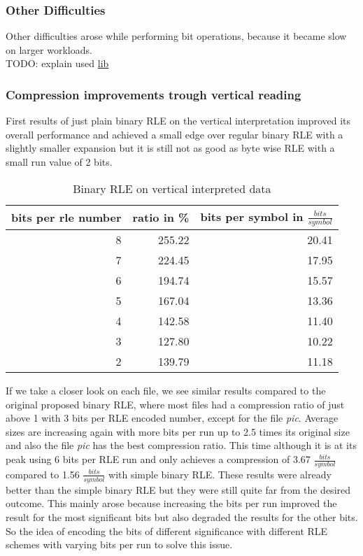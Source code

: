 \subsubsection{Other Difficulties}
\par{
Other difficulties arose while performing bit operations, because it became slow on larger workloads. \\

TODO: explain used \href{https://discuss.kotlinlang.org/t/i-o-streams-for-kotlin/9802}{lib}}

\subsubsection{Compression improvements trough vertical reading}
\par{
First results of just plain binary RLE on the vertical interpretation improved its overall performance and achieved a small edge over regular binary RLE with a slightly smaller expansion but it is still not as good as byte wise RLE with a small run value of 2 bits.
\begin{table}[H]
	\centering
	\begin{tabular}{r|r|r}	
		bits per rle number & ratio in \% & bits per symbol in $\frac{bits}{symbol}$\\
		\hline
		8 & 255.22 & 20.41\\
		7 & 224.45 & 17.95\\
		6 & 194.74 & 15.57\\
		5 & 167.04 & 13.36\\
		4 & 142.58 & 11.40\\
		3 & 127.80 & 10.22\\
		2 & 139.79 & 11.18 \\
	\end{tabular}
	\caption{Binary RLE on vertical interpreted data}
	\label{tab:t30 binary RLE on vertical interpreted data}
\end{table}
}

\par{
If we take a closer look on each file, we see similar results compared to the original proposed binary RLE, where most files had a compression ratio of just above 1 with 3 bits per RLE encoded number, except for the file \textit{pic}. Average sizes are increasing again with more bits per run up to 2.5 times its original size and also the file \textit{pic} has the best compression ratio. This time although it is at its peak using 6 bits per RLE run and only achieves a compression of 3.67 $\frac{bits}{symbol}$ compared to 1.56 $\frac{bits}{symbol}$ with simple binary RLE. These results were already better than the simple binary RLE but they were still quite far from the desired outcome. This mainly arose because increasing the bits per run improved the result for the most significant bits but also degraded the results for the other bits. So the idea of encoding the bits of different significance with different RLE schemes with varying bits per run to solve this issue.  
}

